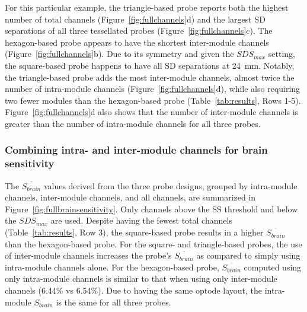 \begin{figure}
\end{figure} 

For this particular example, the triangle-based probe reports both the highest number of total channels (Figure~\ref{fig:fullchannels}d) and the largest \ac{SD} separations of all three tessellated probes (Figure~\ref{fig:fullchannels}c). The hexagon-based probe appears to have the shortest inter-module channels (Figure~\ref{fig:fullchannels}b). Due to its symmetry and given the $SDS_{max}$ setting, the square-based probe happens to have all \ac{SD} separations at 24~mm. Notably, the triangle-based probe adds the most inter-module channels, almost twice the number of intra-module channels (Figure~\ref{fig:fullchannels}d), while also requiring two fewer modules than the hexagon-based probe (Table~\ref{tab:results}, Rows 1-5). Figure~\ref{fig:fullchannels}d also shows that the number of inter-module channels is greater than the number of intra-module channels for all three probes.


\subsubsection{Combining intra- and inter-module channels for brain sensitivity}
The $\overline{S_{brain}}$ values derived from the three probe designs, grouped by intra-module channels, inter-module channels, and all channels, are summarized in Figure~\ref{fig:fullbrainsensitivity}. Only channels above the \ac{SS} threshold and below the $SDS_{max}$ are used. Despite having the fewest total channels (Table~\ref{tab:results}, Row 3), the square-based probe results in a higher $\overline{S_{brain}}$ than the hexagon-based probe. For the square- and triangle-based probes, the use of inter-module channels increases the probe's $\overline{S_{brain}}$ as compared to simply using intra-module channels alone. For the hexagon-based probe, $\overline{S_{brain}}$ computed using only intra-module channels is similar to that when using only inter-module channels (6.44\% vs 6.54\%). Due to having the same optode layout, the intra-module $\overline{S_{brain}}$ is the same for all three probes. 

